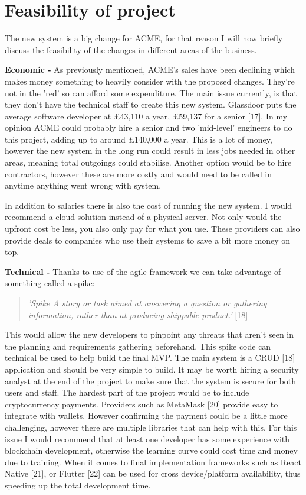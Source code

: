 \section{Feasibility of project}
  The new system is a big change for ACME, for that reason I will now briefly discuss the feasibility of the changes in different areas
  of the business.
  \vspace{0.2cm}

  \noindent\textbf{Economic -} As previously mentioned, ACME's sales have been declining which makes money something to heavily consider with the proposed
  changes. They're not in the 'red' so can afford some expenditure. The main issue currently, is that they don't have the technical staff to create 
  this new system. Glassdoor puts the average software developer at £43,110 a year, £59,137 for a senior [17]. In my opinion ACME could probably hire a senior and
  two 'mid-level' engineers to do this project, adding up to around £140,000 a year. This is a lot of money, however the new system in the long run could result
  in less jobs needed in other areas, meaning total outgoings could stabilise. Another option would be to hire contractors, however
  these are more costly and would need to be called in anytime anything went wrong with system.
  
  In addition to salaries there is also the cost of running the new system. I would recommend a cloud solution instead of a physical server. Not only would the
  upfront cost be less, you also only pay for what you use. These providers can also provide deals to companies who use their systems to save a bit more money on top.
  
  \vspace{0.2cm}

  \noindent\textbf{Technical -} Thanks to use of the agile framework we can take advantage of something called a spike:
  \begin{quote}
    \textit{'Spike A story or task aimed at answering a question or gathering information, rather than at producing shippable product.'} [18]
  \end{quote}
  This would allow the new developers to pinpoint any threats that aren't seen in the planning and requirements gathering beforehand. This spike code can technical
  be used to help build the final MVP. The main system is a CRUD [18] application
  and should be very simple to build. It may be worth hiring a security analyst at the end of the project to make sure that the system is secure for both users 
  and staff.
  The hardest part of the project would be to include cryptocurrency payments. Providers such as MetaMask [20] provide easy to integrate with
  wallets. However confirming the payment could be a little more challenging, however there are multiple libraries that can help with this. For this issue I would
  recommend that at least one developer has some experience with blockchain development, otherwise the learning curve could cost time and money due to training.
  When it comes to final implementation frameworks such as React Native [21], or Flutter [22] can be used for cross device/platform availability, thus speeding up the
  total development time.
  \vspace{0.2cm}

